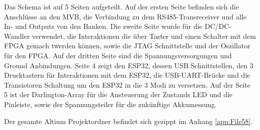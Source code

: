 Das Schema ist auf 5 Seiten aufgeteilt. Auf der ersten Seite befinden sich die Anschlüsse an den MVB, die Verbindung zu dem RS485-Transreceiver und alle In- und Outputs von den Banken. Die zweite Seite wurde für die DC/DC-Wandler verwendet, die Interaktionen die über Taster und einen Schalter mit dem FPGA gemach twerden können, sowie die JTAG Schnittstelle und der Oszillator für den FPGA. Auf der dritten Seite sind die Spannungsversorgungen und Ground Anbindungen. Seite 4 zeigt den ESP32, dessen USB Schnittstellen, den 3 Drucktastern für Interaktionen mit dem ESP32, die USB-UART-Brücke und die Transistoren Schaltung um den ESP32 in die 3 Modi zu versetzen. Auf der Seite 5 ist der Darlington-Array für die Ansteuerung der Zustands LED und die Pinleiste, sowie der Spannungsteiler für die zukünftige Akkumessung. 

Der gesamte Altium Projektordner befindet sich gezippt im Anhang \ref{app:File58}.








